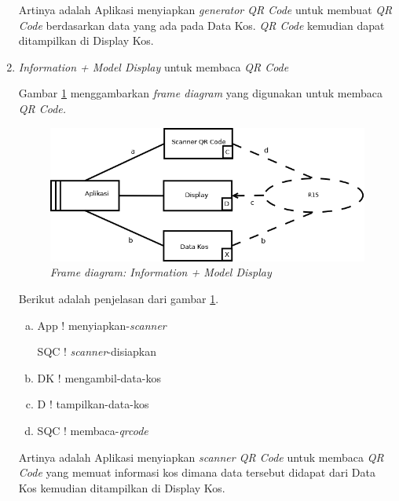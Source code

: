 \begin{enumerate}[-]
		Artinya adalah Aplikasi menyiapkan \textit{generator QR Code} untuk membuat \textit{QR Code} berdasarkan data yang ada pada Data Kos. \textit{QR Code} kemudian dapat ditampilkan di Display Kos.
		
			\item \textit{Information + Model Display} untuk membaca \textit{QR Code}
			
			Gambar \ref{pb7} menggambarkan \textit{frame diagram }yang digunakan untuk membaca \textit{QR Code.}
			
			\begin{figure}[H]
				\centering
				\includegraphics[scale=0.4]{gambar/7}
				\caption{\textit{Frame diagram: Information + Model Display}}
				\label{pb7}
			\end{figure}
		
	
		
			Berikut adalah penjelasan dari gambar \ref{pb7}.
			
			\begin{enumerate}[a.]
				\item App ! menyiapkan-\textit{scanner}
				
				SQC ! \textit{scanner}-disiapkan
				
				\item DK ! mengambil-data-kos
				
				\item D ! tampilkan-data-kos
				\item SQC ! membaca-\textit{qrcode}
			\end{enumerate}
			
			Artinya adalah Aplikasi menyiapkan \textit{scanner QR Code} untuk membaca \textit{QR Code} yang memuat informasi kos dimana data tersebut didapat dari Data Kos kemudian ditampilkan di Display Kos.
		\end{enumerate}
	
